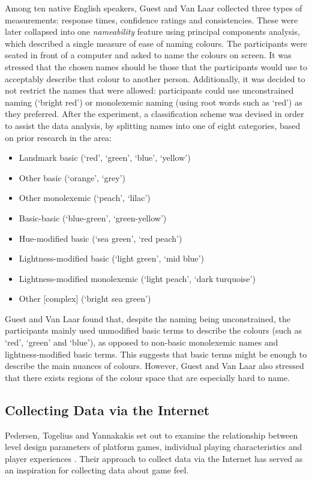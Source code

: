Among ten native English speakers, Guest and Van Laar collected three types of measurements: response times, confidence ratings and consistencies. These were later collapsed into one \textit{nameability} feature using principal components analysis, which described a single measure of ease of naming colours. The participants were seated in front of a computer and asked to name the colours on screen. It was stressed that the chosen names should be those that the participants would use to acceptably describe that colour to another person. Additionally, it was decided to not restrict the names that were allowed: participants could use unconstrained naming (`bright red') or monolexemic naming (using root words such as `red') as they preferred. After the experiment, a classification scheme was devised in order to assist the data analysis, by splitting names into one of eight categories, based on prior research in the area:
\begin{itemize}[noitemsep,nolistsep]
\item Landmark basic (`red', `green', `blue', `yellow')
\item Other basic (`orange', `grey')
\item Other monolexemic (`peach', `lilac')
\item Basic-basic (`blue-green', `green-yellow')
\item Hue-modified basic (`sea green', `red peach')
\item Lightness-modified basic (`light green', `mid blue')
\item Lightness-modified monolexemic (`light peach', `dark turquoise')
\item Other [complex] (`bright sea green')
\end{itemize}
Guest and Van Laar found that, despite the naming being unconstrained, the participants mainly used unmodified basic terms to describe the colours (such as `red', `green' and `blue'), as opposed to non-basic monolexemic names and lightness-modified basic terms. This suggests that basic terms might be enough to describe the main nuances of colours. However, Guest and Van Laar also stressed that there exists regions of the colour space that are especially hard to name.

\subsection{Collecting Data via the Internet} \label{marioLevel}
Pedersen, Togelius and Yannakakis set out to examine the relationship between level design parameters of platform games, individual playing characteristics and player experiences \cite{marioModel}. Their approach to collect data via the Internet has served as an inspiration for collecting data about game feel.

